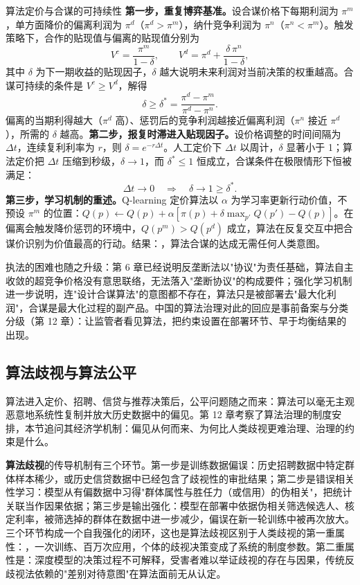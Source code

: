 \begin{derivation}{算法定价与合谋的可持续性}{}
\textbf{第一步，重复博弈基准。}设合谋价格下每期利润为 $\pi^m$，单方面降价的偏离利润为 $\pi^d$（$\pi^d > \pi^m$），纳什竞争利润为 $\pi^n$（$\pi^n < \pi^m$）。触发策略下，合作的贴现值与偏离的贴现值分别为
\[
V^c = \frac{\pi^m}{1-\delta}, \qquad V^d = \pi^d + \frac{\delta\,\pi^n}{1-\delta},
\]
其中 $\delta$ 为下一期收益的贴现因子，$\delta$ 越大说明未来利润对当前决策的权重越高。合谋可持续的条件是 $V^c \ge V^d$，解得
\[
\delta \ge \delta^* = \frac{\pi^d - \pi^m}{\pi^d - \pi^n}.
\]
偏离的当期利得越大（$\pi^d$ 高）、惩罚后的竞争利润越接近偏离利润（$\pi^n$ 接近 $\pi^d$），所需的 $\delta$ 越高。\textbf{第二步，报复时滞进入贴现因子。}设价格调整的时间间隔为 $\Delta t$，连续复利利率为 $r$，则 $\delta = e^{-r\Delta t}$。人工定价下 $\Delta t$ 以周计，$\delta$ 显著小于 1；算法定价把 $\Delta t$ 压缩到秒级，$\delta \to 1$，而 $\delta^* \le 1$ 恒成立，合谋条件在极限情形下恒被满足：
\[
\Delta t \to 0 \quad\Longrightarrow\quad \delta \to 1 \ge \delta^*.
\]
\textbf{第三步，学习机制的重述。}Q-learning 定价算法以 $\alpha$ 为学习率更新行动价值，不预设 $\pi^m$ 的位置：$Q(p) \leftarrow Q(p) + \alpha[\pi(p) + \delta\max_{p'}Q(p') - Q(p)]$。在偏离会触发降价惩罚的环境中，$Q(p^m) > Q(p^d)$ 成立，算法在反复交互中把合谋价识别为价值最高的行动。结果：，算法合谋的达成无需任何人类意图。
\end{derivation}

执法的困难也随之升级：第 6 章已经说明反垄断法以"协议"为责任基础，算法自主收敛的超竞争价格没有意思联络，无法落入"垄断协议"的构成要件；强化学习机制进一步说明，连"设计合谋算法"的意图都不存在，算法只是被部署去"最大化利润"，合谋是最大化过程的副产品。中国的算法治理对此的回应是事前备案与分类分级（第 12 章）：让监管者看见算法，把约束设置在部署环节、早于均衡结果的出现。

\subsection{算法歧视与算法公平}

算法进入定价、招聘、信贷与推荐决策后，公平问题随之而来：算法可以毫无主观恶意地系统性复制并放大历史数据中的偏见。第 12 章考察了算法治理的制度安排，本节追问其经济学机制：偏见从何而来、为何比人类歧视更难治理、治理的约束是什么。

\textbf{算法歧视}的传导机制有三个环节。第一步是训练数据偏误：历史招聘数据中特定群体样本稀少，或历史信贷数据中已经包含了歧视性的审批结果；第二步是错误相关性学习：模型从有偏数据中习得"群体属性与胜任力（或信用）的伪相关"，把统计关联当作因果依据；第三步是输出强化：模型在部署中依据伪相关筛选候选人、核定利率，被筛选掉的群体在数据中进一步减少，偏误在新一轮训练中被再次放大。三个环节构成一个自我强化的闭环，这也是算法歧视区别于人类歧视的第一重属性：，一次训练、百万次应用，个体的歧视决策变成了系统的制度参数。第二重属性是：深度模型的决策过程不可解释，受害者难以举证歧视的存在与因果，传统反歧视法依赖的"差别对待意图"在算法面前无从认定。

